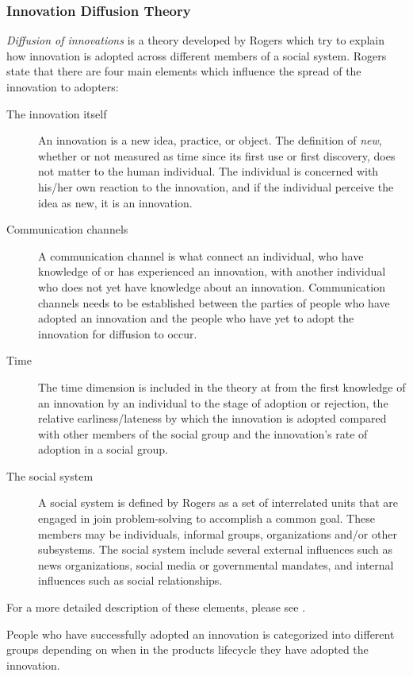 \subsubsection{Innovation Diffusion Theory}
\textit{Diffusion of innovations} is a theory developed by Rogers \cite{Rogers1983} which try to explain how innovation is adopted across different members of a social system. Rogers state that there are four main elements which influence the spread of the innovation to adopters:

\begin{description}
  \item [The innovation itself] An innovation is a new idea, practice, or object. The definition of \textit{new}, whether or not measured as time since its first use or first discovery, does not matter to the human individual. The individual is concerned with his/her own reaction to the innovation, and if the individual perceive the idea as new, it is an innovation.
  \item [Communication channels] A communication channel is what connect an individual, who have knowledge of or has experienced an innovation, with another individual who does not yet have knowledge about an innovation. Communication channels needs to be established between the parties of people who have adopted an innovation and the people who have yet to adopt the innovation for diffusion to occur.
  \item [Time] The time dimension is included in the theory at from the first knowledge of an innovation by an individual to the stage of adoption or rejection, the relative earliness/lateness by which the innovation is adopted compared with other members of the social group and the innovation's rate of adoption in a social group.
  \item [The social system] A social system is defined by Rogers \cite{Rogers1983} as a set of interrelated units that are engaged in join problem-solving to accomplish a common goal. These members may be individuals, informal groups, organizations and/or other subsystems. The social system include several external influences such as news organizations, social media or governmental mandates, and internal influences such as social relationships.
\end{description}

For a more detailed description of these elements, please see \cite{Rogers1983}.

People who have successfully adopted an innovation is categorized into different groups depending on when in the products lifecycle they have adopted the innovation.

